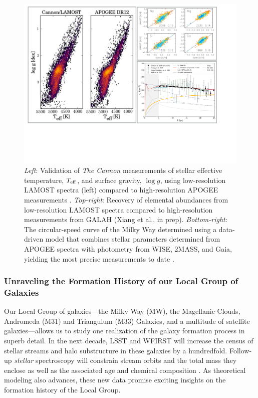 \documentclass[oneside,11pt]{amsart}
\begin{document}
\begin{figure}[h!]
%
\vskip -0.1in
%
\includegraphics[width=\textwidth]{figs/LGplots}
%
\caption{{\it Left}: Validation of {\it The Cannon} measurements of
stellar effective temperature, $T_{\rm eff}$, and surface gravity, $\log
g$, using low-resolution LAMOST spectra (left) compared to
high-resolution APOGEE measurements
\citep[right;][]{2017ApJ...836....5H}. {\it Top-right}: Recovery of
elemental abundances from low-resolution LAMOST spectra compared to
high-resolution measurements from GALAH (Xiang et al., in prep).  {\it
Bottom-right}: The circular-speed curve of the Milky Way determined
using a data-driven model that combines stellar parameters determined
from APOGEE spectra with photometry from WISE, 2MASS, and Gaia, yielding
the most precise measurements to date \citep{2019ApJ...871..120E}.}
%
\label{fig:Cannon}
%
\end{figure}

\subsubsection{Unraveling the Formation History of our Local Group of Galaxies}
\label{sec:localgroup}

Our Local Group of galaxies---the Milky Way (MW),
the Magellanic Clouds, Andromeda (M31) and Triangulum (M33)
Galaxies, and a multitude of satellite galaxies---allows us to study one
realization of the galaxy formation process in superb detail.  In the next decade, LSST and WFIRST will increase the
census of stellar streams and halo substructure in these galaxies by a hundredfold.  Follow-up \emph{stellar}
spectroscopy will constrain stream orbits and the total mass they enclose \citep{2017ApJ...836..234S} as well as
the associated age and chemical composition
\citep{2019MNRAS.484.3425M}.  As theoretical modeling also advances, these new data promise exciting insights on the formation
history of the Local Group.
\end{document}
